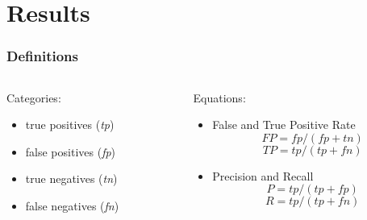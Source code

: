 \documentclass{beamer}
\begin{document}
\section[Results]{Results}

\begin{frame}
\frametitle[Definitions]{Definitions}
\begin{columns}
\begin{column}{0.5\textwidth}
Categories:
\begin{itemize}
\item true positives (\textit{tp})
\item false positives (\textit{fp})
\item true negatives (\textit{tn})
\item false negatives (\textit{fn})
\end{itemize}
\end{column}
\begin{column}{0.5\textwidth}
Equations:
\begin{itemize}
\item False and True Positive Rate
\begin{equation*}
FP = fp / (fp + tn)
\end{equation*}
\begin{equation*}
TP = tp / (tp + fn)
\end{equation*}
\item Precision and Recall
\begin{equation*}
P = tp / (tp + fp)
\end{equation*}
\begin{equation*}
R = tp / (tp + fn)
\end{equation*}
\end{itemize}
\end{column}
\end{columns}
\end{frame}
\end{document}
